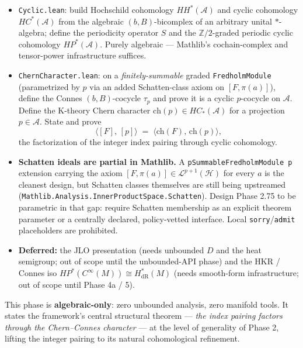 \documentclass[
  11pt,
]{article}
\providecommand{\tightlist}{%
  \setlength{\itemsep}{0pt}\setlength{\parskip}{0pt}}
\begin{document}
\begin{itemize}
\tightlist
\item
  \texttt{Cyclic.lean}: build Hochschild cohomology
  \(HH^*(\mathcal{A})\) and cyclic cohomology \(HC^*(\mathcal{A})\) from
  the algebraic \((b, B)\)-bicomplex of an arbitrary unital
  \(*\)-algebra; define the periodicity operator \(S\) and the
  \(\mathbb{Z}/2\)-graded periodic cyclic cohomology
  \(HP^*(\mathcal{A})\). Purely algebraic --- Mathlib's cochain-complex
  and tensor-power infrastructure suffices.
\item
  \texttt{ChernCharacter.lean}: on a \emph{finitely-summable} graded
  \texttt{FredholmModule} (parametrized by \(p\) via an added
  Schatten-class axiom on \([F, \pi(a)]\)), define the Connes
  \((b, B)\)-cocycle \(\tau_p\) and prove it is a cyclic \(p\)-cocycle
  on \(\mathcal{A}\). Define the K-theory Chern character
  \(\mathrm{ch}(p) \in HC_*(\mathcal{A})\) for a projection
  \(p \in \mathcal{A}\). State and prove
  \[\bigl\langle [F],\,[p] \bigr\rangle \;=\; \bigl\langle \mathrm{ch}(F),\,\mathrm{ch}(p) \bigr\rangle,\]
  the factorization of the integer index pairing through cyclic
  cohomology.
\item
  \textbf{Schatten ideals are partial in Mathlib.} A
  \texttt{pSummableFredholmModule\ p} extension carrying the axiom
  \([F, \pi(a)] \in \mathcal{L}^{p+1}(\mathcal{H})\) for every \(a\) is
  the cleanest design, but Schatten classes themselves are still being
  upstreamed (\texttt{Mathlib.Analysis.InnerProductSpace.Schatten}).
  Design Phase 2.75 to be parametric in that gap: require Schatten
  membership as an explicit theorem parameter or a centrally declared,
  policy-vetted interface. Local \texttt{sorry}/\texttt{admit}
  placeholders are prohibited.
\item
  \textbf{Deferred:} the JLO presentation (needs unbounded \(D\) and the
  heat semigroup; out of scope until the unbounded-API phase) and the
  HKR / Connes iso \(HP^*(C^\infty(M)) \cong H^*_{\mathrm{dR}}(M)\)
  (needs smooth-form infrastructure; out of scope until Phase 4a / 5).
\end{itemize}

This phase is \textbf{algebraic-only}: zero unbounded analysis, zero
manifold tools. It states the framework's central structural theorem ---
\emph{the index pairing factors through the Chern--Connes character} ---
at the level of generality of Phase 2, lifting the integer pairing to
its natural cohomological refinement.
\end{document}

